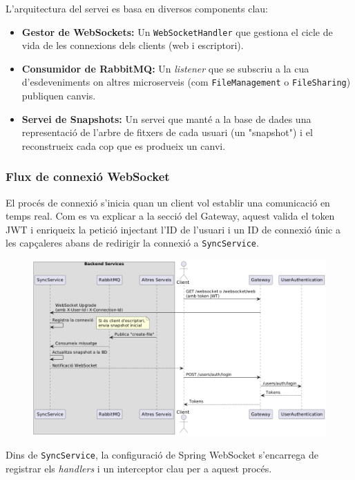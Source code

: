 L'arquitectura del servei es basa en diversos components clau:
\begin{itemize}
    \item \textbf{Gestor de WebSockets:} Un \texttt{WebSocketHandler} que gestiona el cicle de vida de les connexions dels clients (web i escriptori).
    \item \textbf{Consumidor de RabbitMQ:} Un \textit{listener} que se subscriu a la cua d'esdeveniments on altres microserveis (com \texttt{FileManagement} o \texttt{FileSharing}) publiquen canvis.
    \item \textbf{Servei de Snapshots:} Un servei que manté a la base de dades una representació de l'arbre de fitxers de cada usuari (un "snapshot") i el reconstrueix cada cop que es produeix un canvi.
\end{itemize}

\subsubsection{Flux de connexió WebSocket}

El procés de connexió s'inicia quan un client vol establir una comunicació en temps real. Com es va explicar a la secció del Gateway, aquest valida el token JWT i enriqueix la petició injectant l'ID de l'usuari i un ID de connexió únic a les capçaleres abans de redirigir la connexió a \texttt{SyncService}.

\begin{figure}[H]
    \centering
    \includegraphics[width=\textwidth]{Figures/flux/connect_websocket.png}
\end{figure}

Dins de \texttt{SyncService}, la configuració de Spring WebSocket s'encarrega de registrar els \textit{handlers} i un interceptor clau per a aquest procés.

